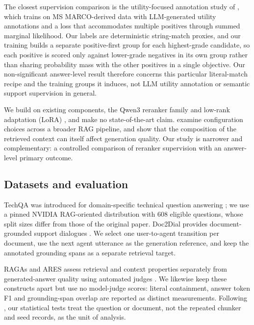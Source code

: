 The closest supervision comparison is the utility-focused annotation study of \citet{zhang2025utility}, which trains on MS MARCO-derived data with LLM-generated utility annotations and a loss that accommodates multiple positives through summed marginal likelihood. Our labels are deterministic string-match proxies, and our training builds a separate positive-first group for each highest-grade candidate, so each positive is scored only against lower-grade negatives in its own group rather than sharing probability mass with the other positives in a single objective. Our non-significant answer-level result therefore concerns this particular literal-match recipe and the training groups it induces, not LLM utility annotation or semantic support supervision in general.

We build on existing components, the Qwen3 reranker family \citep{zhang2025qwen} and low-rank adaptation (LoRA) \citep{hu2021}, and make no state-of-the-art claim. \citet{wang2024} examine configuration choices across a broader RAG pipeline, and \citet{cuconasu2024} show that the composition of the retrieved context can itself affect generation quality. Our study is narrower and complementary: a controlled comparison of reranker supervision with an answer-level primary outcome.

\subsection{Datasets and evaluation}
TechQA was introduced for domain-specific technical question answering \citep{castelli2020}; we use a pinned NVIDIA RAG-oriented distribution with 608 eligible questions, whose split sizes differ from those of the original paper. Doc2Dial provides document-grounded support dialogues \citep{feng2020}. We select one user-to-agent transition per document, use the next agent utterance as the generation reference, and keep the annotated grounding spans as a separate retrieval target.

RAGAs and ARES assess retrieval and context properties separately from generated-answer quality using automated judges \citep{es2024,saad2024}. We likewise keep these constructs apart but use no model-judge scores: literal containment, answer token F1 and grounding-span overlap are reported as distinct measurements. Following \citet{dror2018}, our statistical tests treat the question or document, not the repeated chunker and seed records, as the unit of analysis.

